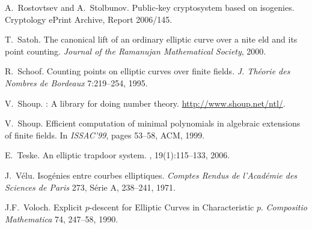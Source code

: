 \begin{thebibliography}{AAAA00}
  A.~Rostovtsev and A.~Stolbunov.
  \newblock Public-key cryptosystem based on isogenies.
  \newblock Cryptology ePrint Archive, Report 2006/145.
  
  T.~Satoh.
  \newblock The canonical lift of an ordinary elliptic curve over a nite eld and its point counting.
  \newblock \emph{Journal of the Ramanujan Mathematical Society}, 2000.

  R.~Schoof.
  \newblock Counting points on elliptic curves over finite fields.
  \newblock \emph{J. Théorie des Nombres de Bordeaux} 7:219--254, 1995.

  V.~Shoup.
  : A library for doing number theory.
  \newblock \url{http://www.shoup.net/ntl/}.

  V.~Shoup. 
  \newblock Efficient computation of minimal polynomials in algebraic extensions of finite fields. 
  \newblock In \emph{ISSAC'99}, pages 53--58, ACM, 1999.

  E.~Teske.
  \newblock An elliptic trapdoor system.
  , 19(1):115--133, 2006.

J.~V\'elu.
  \newblock Isogénies entre courbes elliptiques.
  \newblock \emph{Comptes Rendus de l'Académie des Sciences de Paris} 273,
  Série A, 238--241, 1971.

J.F.~Voloch.
  \newblock Explicit $p$-descent for Elliptic Curves in Characteristic $p$.
  \newblock \emph{Compositio Mathematica} 74, 247--58, 1990.
  
\end{thebibliography}

